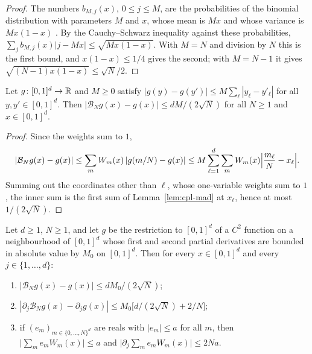 \begin{proof}
The numbers $b_{M,j}(x)$, $0\le j\le M$, are the probabilities of the binomial distribution with parameters $M$ and
$x$, whose mean is $Mx$ and whose variance is $Mx(1-x)$ \cite[\S1.1]{Lorentz1986}. By the Cauchy--Schwarz
inequality against these probabilities, $\sum_jb_{M,j}(x)|j-Mx|\le\sqrt{Mx(1-x)}$. With $M=N$ and division by $N$
this is the first bound, and $x(1-x)\le1/4$ gives the second; with $M=N-1$ it gives
$\sqrt{(N-1)x(1-x)}\le\sqrt N/2$.
\end{proof}

\begin{lemma}\label{lem:cpl-bernstein-value}
Let $g\colon[0,1]^d\to\mathbb{R}$ and $M\ge0$ satisfy $|g(y)-g(y')|\le M\sum_{\ell}|y_\ell-y'_\ell|$ for all
$y,y'\in[0,1]^d$. Then $|\mathcal B_Ng(x)-g(x)|\le dM/(2\sqrt N)$ for all $N\ge1$ and $x\in[0,1]^d$.
\end{lemma}

\begin{proof}
Since the weights sum to $1$,
\[
 |\mathcal B_Ng(x)-g(x)|\le\sum_mW_m(x)\,|g(m/N)-g(x)|\le M\sum_{\ell=1}^d\sum_mW_m(x)\Bigl|\frac{m_\ell}N-x_\ell\Bigr|.
\]
Summing out the coordinates other than $\ell$, whose one-variable weights sum to $1$, the inner sum is the first sum
of Lemma~\ref{lem:cpl-mad} at $x_\ell$, hence at most $1/(2\sqrt N)$.
\end{proof}

\begin{proposition}\label{prop:cpl-bernstein}
Let $d\ge1$, $N\ge1$, and let $g$ be the restriction to $[0,1]^d$ of a $C^2$ function on a neighbourhood of
$[0,1]^d$ whose first and second partial derivatives are bounded in absolute value by $M_0$ on $[0,1]^d$. Then for
every $x\in[0,1]^d$ and every $j\in\{1,\dots,d\}$:
\begin{enumerate}[label=(\alph*)]
\item $|\mathcal B_Ng(x)-g(x)|\le dM_0/(2\sqrt N)$;
\item $|\partial_j\mathcal B_Ng(x)-\partial_jg(x)|\le M_0\bigl[d/(2\sqrt N)+2/N\bigr]$;
\item if $(e_m)_{m\in\{0,\dots,N\}^d}$ are reals with $|e_m|\le a$ for all $m$, then
 $\bigl|\sum_me_mW_m(x)\bigr|\le a$ and $\bigl|\partial_j\sum_me_mW_m(x)\bigr|\le2Na$.
\end{enumerate}
\end{proposition}

